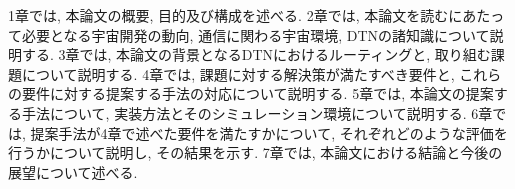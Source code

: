 1章では, 本論文の概要, 目的及び構成を述べる. 
2章では, 本論文を読むにあたって必要となる宇宙開発の動向, 通信に関わる宇宙環境, DTNの諸知識について説明する. 
3章では, 本論文の背景となるDTNにおけるルーティングと, 取り組む課題について説明する.
4章では, 課題に対する解決策が満たすべき要件と, これらの要件に対する提案する手法の対応について説明する. 
5章では, 本論文の提案する手法について, 実装方法とそのシミュレーション環境について説明する. 
6章では, 提案手法が4章で述べた要件を満たすかについて, それぞれどのような評価を行うかについて説明し, その結果を示す. 
7章では, 本論文における結論と今後の展望について述べる.